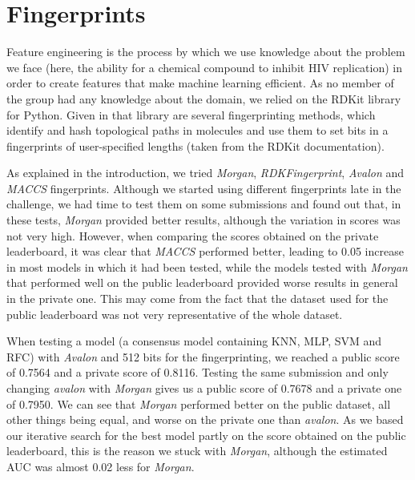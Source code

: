 \section{Fingerprints}\label{sec:fingerprint}
Feature engineering is the process by which we use knowledge about the problem we face (here, the ability for a chemical compound to inhibit HIV replication) in order to create features that make machine learning efficient. As no member of the group had any knowledge about the domain, we relied on the RDKit library for Python. Given in that library are several fingerprinting methods, which identify and hash topological paths in molecules and use them to set bits in a fingerprints of user-specified lengths (taken from the RDKit documentation).

As explained in the introduction, we tried \textit{Morgan}, \textit{RDKFingerprint}, \textit{Avalon} and \textit{MACCS} fingerprints. Although we started using different fingerprints late in the challenge, we had time to test them on some submissions and found out that, in these tests, \textit{Morgan} provided better results, although the variation in scores was not very high. However, when comparing the scores obtained on the private leaderboard, it was clear that \textit{MACCS} performed better, leading to \num{0.05} increase in most models in which it had been tested, while the models tested with \textit{Morgan} that performed well on the public leaderboard provided worse results in general in the private one. This may come from the fact that the dataset used for the public leaderboard was not very representative of the whole dataset.

When testing a model (a consensus model containing KNN, MLP, SVM and RFC) with \textit{Avalon} and \num{512} bits for the fingerprinting, we reached a public score of \num{0.7564} and a private score of \num{0.8116}. Testing the same submission and only changing \textit{avalon} with \textit{Morgan} gives us a public score of \num{0.7678} and a private one of \num{0.7950}. We can see that \textit{Morgan} performed better on the \og{}public dataset\fg{}, all other things being equal, and worse on the private one than \textit{avalon}. As we based our iterative search for the best model partly on the score obtained on the public leaderboard, this is the reason we stuck with \textit{Morgan}, although the estimated AUC was almost \num{0.02} less for \textit{Morgan}.
